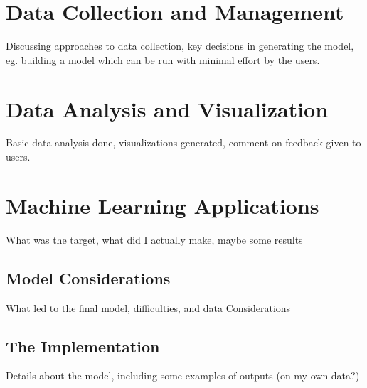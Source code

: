 \chapter{Data Collection and Management}
Discussing approaches to data collection, key decisions in generating the model, eg. building a model which can be run with minimal effort by the users.

\chapter{Data Analysis and Visualization}
Basic data analysis done, visualizations generated, comment on feedback given to users.
\chapter{Machine Learning Applications}
What was the target, what did I actually make, maybe some results
\section{Model Considerations}
What led to the final model, difficulties, and data Considerations

\section{The Implementation}
Details about the model, including some examples of outputs (on my own data?)


